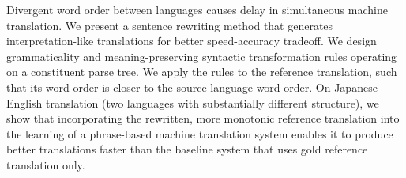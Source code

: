 Divergent word order between languages causes delay in simultaneous machine translation. We present a sentence rewriting method that generates interpretation-like translations for better speed-accuracy tradeoff. We design grammaticality and meaning-preserving syntactic transformation rules operating on a constituent parse tree. We apply the rules to the reference translation, such that its word order is closer to the source language word order. On Japanese-English translation (two languages with substantially different structure), we show that incorporating the rewritten, more monotonic reference translation into the learning of a phrase-based machine translation system enables it to produce better translations faster than the baseline system that uses gold reference translation only.
